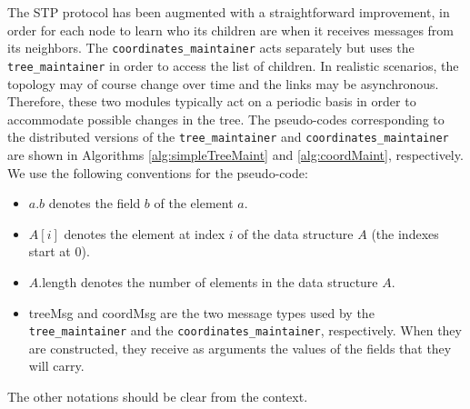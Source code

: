 \documentclass[conference]{IEEEtran}
\begin{document}
The STP protocol has been augmented with a straightforward improvement, in order for each node to learn who its children are when it receives messages from its neighbors. The \texttt{coordinates\_maintainer} acts separately but uses the \texttt{tree\_maintainer} in order to access the list of children.
In realistic scenarios, the topology may of course 
change over time and the links may be asynchronous. Therefore, these two modules typically act on a periodic basis in order to accommodate possible changes in the tree. The pseudo-codes corresponding to the distributed versions of the \texttt{tree\_maintainer} and \texttt{coordinates\_maintainer} are shown in Algorithms \ref{alg:simpleTreeMaint} and \ref{alg:coordMaint}, respectively. 
We use the following conventions for the pseudo-code:
\begin{itemize}
\item $a.b$ denotes the field $b$ of the element $a$.
\item $A[i]$ denotes the element at index $i$ of the data structure $A$ (the indexes start at $0$).
\item $A$.length denotes the number of elements in the data structure $A$.
\item treeMsg and coordMsg are the two message types used by the \texttt{tree\_maintainer} and the \texttt{coordinates\_maintainer}, respectively. When they are constructed, they receive as arguments the values of the fields that they will carry.
\end{itemize}
The other notations should be clear from the context.
\end{document}
